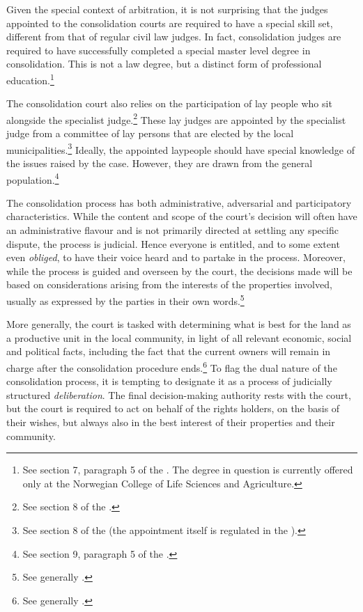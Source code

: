 {Given the special context of arbitration, it is not surprising that the judges appointed to the consolidation courts are required to have a special skill set, different from that of regular civil law judges. In fact, consolidation judges are required to have successfully completed a special master level degree in consolidation. This is not a law degree, but a distinct form of professional education.\footnote{See section 7, paragraph 5 of the \cite{lca79}. The degree in question is currently offered only at the Norwegian College of Life Sciences and Agriculture.}

The consolidation court also relies on the participation of lay people who sit alongside the specialist judge.\footnote{See section 8 of the \cite{lca79}.} These lay judges are appointed by the specialist judge from a committee of lay persons that are elected by the local municipalities.\footnote{See section 8 of the \cite{lca79} (the appointment itself is regulated in the \dni\cite[64]{ca15}).} Ideally, the appointed laypeople should have special knowledge of the issues raised by the case. However, they are drawn from the general population.\footnote{See section 9, paragraph 5 of the \cite{lca79}.}
}

The consolidation process has both administrative, adversarial and participatory characteristics. While the content and scope of the court's decision will often have an administrative flavour and is not primarily directed at settling any specific dispute, the process is judicial. Hence everyone is entitled, and to some extent even \emph{obliged}, to have their voice heard and to partake in the process. Moreover, while the process is guided and overseen by the court, the decisions made will be based on considerations arising from the interests of the properties involved, usually as expressed by the parties in their own words.\footnote{See generally \cite{rognes07}.} 

More generally, the court is tasked with determining what is best for the land as a productive unit in the local community, in light of all relevant economic, social and political facts, including the fact that the current owners will remain in charge after the consolidation procedure ends.\footnote{See generally \cite{reiten09,sky09}.} To flag the dual nature of the consolidation process, it is tempting to designate it as a process of judicially structured \emph{deliberation}. The final decision-making authority rests with the court, but the court is required to act on behalf of the rights holders, on the basis of their wishes, but always also in the best interest of their properties and their community.

